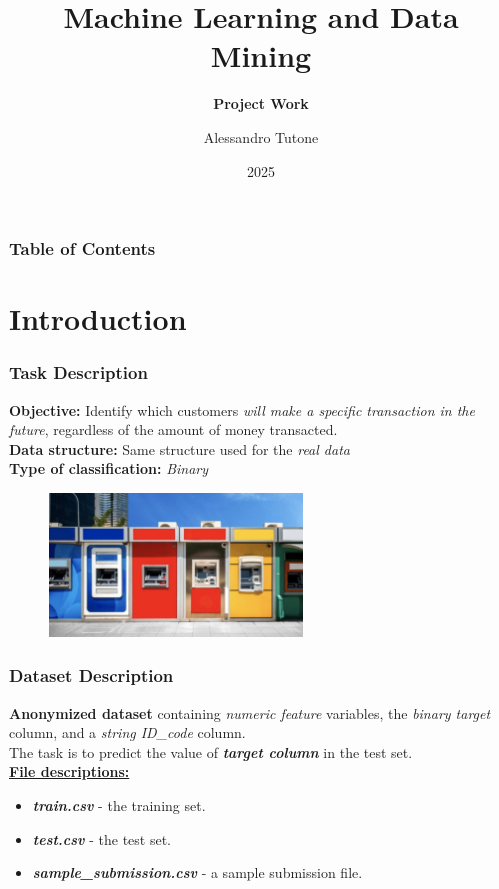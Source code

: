 \documentclass{beamer}
\title[MLDM - Project Work]{Machine Learning and Data Mining}
\subtitle{\textbf{Project Work}}
\author{Alessandro Tutone}
\institute[UniBo]{\textit{Alma Mater Studiorum}, Università degli Studi di Bologna}
\date{2025}
\begin{document}
\frame{\titlepage}

\begin{frame}
\frametitle{Table of Contents}
\tableofcontents
\end{frame}


\section{Introduction}

\begin{frame}
\frametitle{Task Description}
\textbf{Objective:} Identify which customers \textit{will make a specific transaction in the future}, regardless of the amount of money transacted. 
\newline\\
\textbf{Data structure:} Same structure used for the \textit{real data}
\newline\\
\textbf{Type of classification:} \textit{Binary}
\begin{figure}
\centering
    \includegraphics[width=0.6\textwidth]{imgs/task.png}
    \label{fig:task}
\end{figure}
\end{frame}

\begin{frame}
\frametitle{Dataset Description}
\textbf{Anonymized dataset} containing \textit{numeric feature} variables, the \textit{binary target} column, and a \textit{string ID\_code} column.
\newline\\
The task is to predict the value of \textbf{\textit{target column}} in the test set.
\newline\\
\underline{\textbf{File descriptions:}}
\begin{itemize}
    \item \textit{\textbf{train.csv}} - the training set.
    \item \textbf{\textit{test.csv}} - the test set.
    \item \textit{\textbf{sample\_submission.csv}} - a sample submission file.
\end{itemize}
\end{frame}
\end{document}
